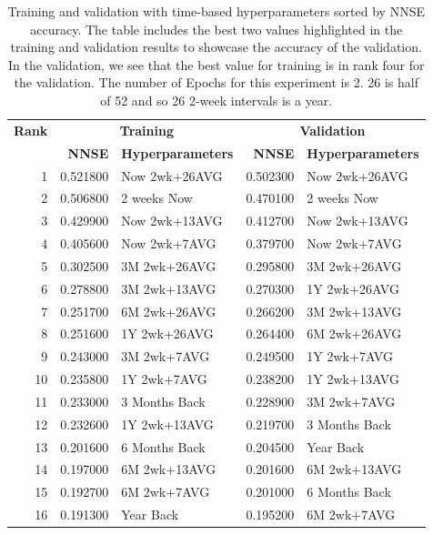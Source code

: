 \documentclass[utf8]{FrontiersinVancouver} %
\begin{document}
\begin{table}[p]

  \caption{Training and validation with time-based hyperparameters
    sorted by NNSE accuracy. The table includes the best two
    values highlighted in the training and validation results to
    showcase the accuracy of the validation. In the validation,
    we see that the best value for training is in rank four for the
    validation. The number of Epochs for this experiment is 2.
    26 is half of 52 and so 26 2-week intervals is a year.}
  \label{tab:training-2}

  \renewcommand{\arraystretch}{1.2}
  \begin{center}
    {\footnotesize
\begin{tabular}{|r|rl||rl|}
  \hline
{\bf Rank} & \multicolumn{2}{c||}{\bfseries Training} & \multicolumn{2}{c|}{\bfseries Validation}  \\
     &   {\bf NNSE} & {\bf Hyperparameters} & {\bf NNSE} & {\bf Hyperparameters} \\
\hline
1 & \color{red}  0.521800 & \color{red} Now 2wk+26AVG & \color{red} 0.502300 & \color{red} Now 2wk+26AVG \\
2 & \color{blue} 0.506800 & \color{blue} 2 weeks Now & \color{blue} 0.470100 & \color{blue} 2 weeks Now \\
3 & \color{teal} 0.429900 & \color{teal} Now 2wk+13AVG & \color{teal} 0.412700 & \color{teal} Now 2wk+13AVG \\
4 & 0.405600 & Now 2wk+7AVG & 0.379700 & Now 2wk+7AVG \\
5 & 0.302500 & 3M 2wk+26AVG & 0.295800 & 3M 2wk+26AVG \\
6 & 0.278800 & 3M 2wk+13AVG & 0.270300 & 1Y 2wk+26AVG \\
7 & 0.251700 & 6M 2wk+26AVG & 0.266200 & 3M 2wk+13AVG \\
8 & 0.251600 & 1Y 2wk+26AVG & 0.264400 & 6M 2wk+26AVG \\
9 & 0.243000 & 3M 2wk+7AVG & 0.249500 & 1Y 2wk+7AVG \\
10 & 0.235800 & 1Y 2wk+7AVG & 0.238200 & 1Y 2wk+13AVG \\
11 & 0.233000 & 3 Months Back & 0.228900 & 3M 2wk+7AVG \\
12 & 0.232600 & 1Y 2wk+13AVG & 0.219700 & 3 Months Back \\
13 & 0.201600 &  6 Months Back & 0.204500 & Year Back \\
14 & 0.197000 & 6M 2wk+13AVG & 0.201600 & 6M 2wk+13AVG \\
15 & 0.192700 &  6M 2wk+7AVG &  0.201000 & 6 Months Back \\
16 &  0.191300 & Year Back & 0.195200 & 6M 2wk+7AVG \\
\hline
\end{tabular}
}
\end{center}


\end{table}
\end{document}
